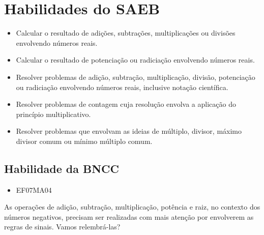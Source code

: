 \section*{Habilidades do SAEB }

\begin{itemize}
\item Calcular o resultado de adições, subtrações,
multiplicações ou divisões envolvendo números reais.
\item
  Calcular o resultado de potenciação ou radiciação envolvendo números
  reais.
\item
  Resolver problemas de adição, subtração, multiplicação, divisão,
  potenciação ou radiciação envolvendo números reais, inclusive notação
  científica.
\item
  Resolver problemas de contagem cuja resolução envolva a aplicação do
  princípio multiplicativo.
\item
  Resolver problemas que envolvam as ideias de múltiplo, divisor, máximo
  divisor comum ou mínimo múltiplo comum.
\end{itemize}

\subsection{Habilidade da BNCC }
\begin{itemize}
\item EF07MA04
\end{itemize}


As operações de adição, subtração, multiplicação, potência e raiz, no
contexto dos números negativos, precisam ser realizadas com mais atenção
por envolverem as regras de sinais. Vamos relembrá-las?

